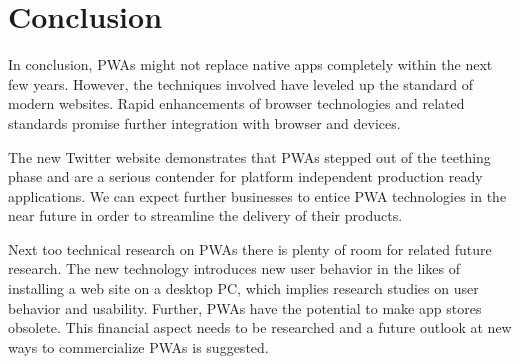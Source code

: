 \chapter{Conclusion}

In conclusion, PWAs might not replace native apps completely within the next few years. However, the techniques involved have leveled up the standard of modern websites. Rapid enhancements of browser technologies and related standards promise further integration with browser and devices.

The new Twitter website demonstrates that PWAs stepped out of the teething phase and are a serious contender for platform independent production ready applications. We can expect further businesses to entice PWA technologies in the near future in order to streamline the delivery of their products.

Next too technical research on PWAs there is plenty of room for related future research. The new technology introduces new user behavior in the likes of installing a web site on a desktop PC, which implies research studies on user behavior and usability. Further, PWAs have the potential to make app stores obsolete. This financial aspect needs to be researched and a future outlook at new ways to commercialize PWAs is suggested.
